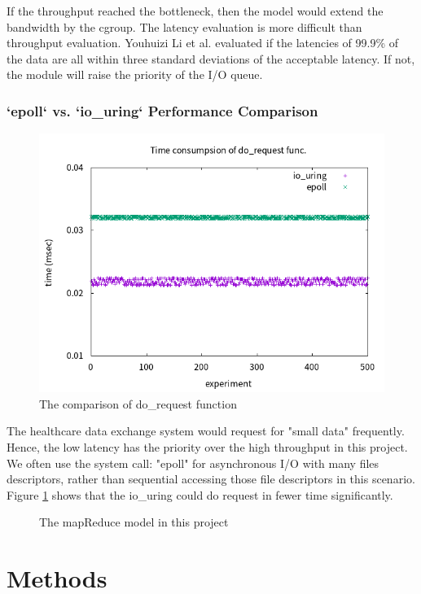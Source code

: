 \documentclass[12pt,a4paper]{article}
\begin{document}
If the throughput reached the bottleneck, then the model would extend the
bandwidth by the cgroup. The latency evaluation is more difficult than throughput
evaluation. Youhuizi Li et al. \cite{Optimizing} evaluated if the latencies of 99.9\% of the
data are all within three standard deviations of the acceptable latency. If not,
the module will raise the priority of the I/O queue.

\subsubsection{`epoll` vs. `io\_uring` Performance Comparison}
\begin{figure}
  \includegraphics[width=.45\textwidth]{io_uring.png}
  \caption{The comparison of do\_request function}
  \label{Fig:iouring}
\end{figure}
The healthcare data exchange system would request for "small data" frequently.
Hence, the low latency has the priority over the high throughput in this project.
We often use the system call: "epoll" for asynchronous I/O with many files
descriptors, rather than sequential accessing those file descriptors in this scenario.
Figure \ref*{Fig:iouring} \cite{epoll_vs_iouring} shows that the io\_uring could do
request in fewer time significantly.
\begin{figure}
  \caption[]{The mapReduce model in this project}
  \label{Fig:model}
\end{figure}

\section{Methods}
\end{document}

